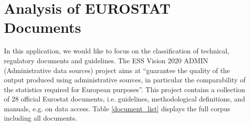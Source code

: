 \documentclass[11pt,a4paper]{article}
\begin{document}
\section{Analysis of EUROSTAT Documents}\label{sec:example2}

In this application, we would like to focus on the classification of technical, regulatory documents and guidelines. The ESS Vision 2020 ADMIN (Administrative data sources) project aims at “guarantee the quality of the output produced using administrative sources, in particular the comparability of the statistics required for European purposes”\cite{ESSVision2020}. This project contains a collection of 28 official Eurostat documents, i.e. guidelines, methodological definitions, and manuals, e.g. on data access. Table \ref{document_list} displays the full corpus including all documents.\\
\end{document}
